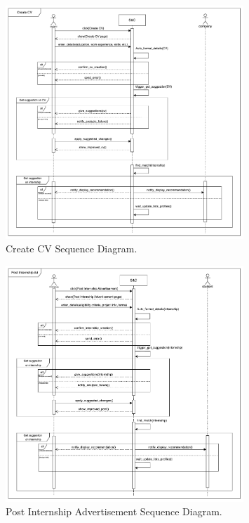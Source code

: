 \begin{figure}[H]
\centering
\includegraphics[width=0.8\textwidth]{Images/Create_CV_Sequence_Diagram (1).png}
\caption{\label{fig:metamodel9}Create CV Sequence Diagram.}
\end{figure}


\begin{figure}[H]
\centering
\includegraphics[width=0.8\textwidth]{Images/Post_Internship_Sequence_Diagram.png}
\caption{\label{fig:metamodel9}Post Internship Advertisement Sequence Diagram.}
\end{figure}


